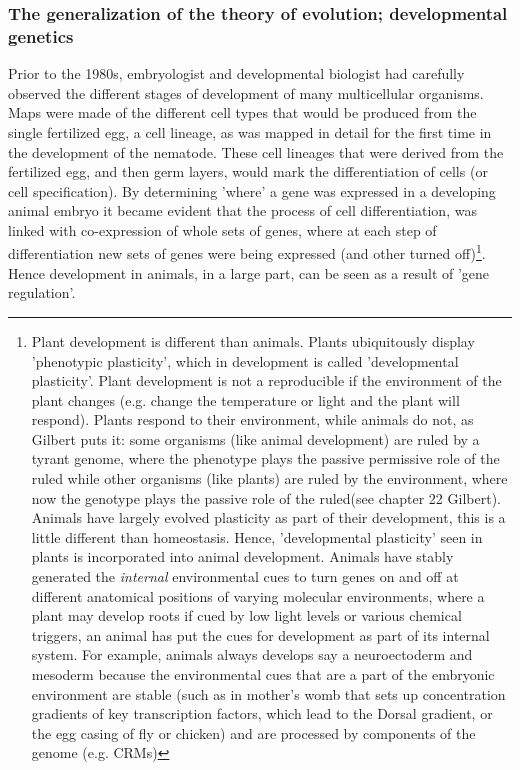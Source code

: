 \subsubsection{The generalization of the theory of evolution; developmental genetics}
Prior to the 1980s, embryologist and developmental biologist had carefully observed the different stages of development of many multicellular organisms.  Maps were made of the different cell types that would be produced from the single fertilized egg, a cell lineage, as was mapped in detail for the first time in the development of the nematode.  These cell lineages that were derived from the fertilized egg, and then germ layers, would mark the differentiation of cells (or cell specification).  By determining 'where' a gene was expressed in a developing animal embryo it became evident that the process of cell differentiation, was linked with co-expression of whole sets of genes, where at each step of differentiation new sets of genes were being expressed (and other turned off)\footnote{Plant development is different than animals.  Plants ubiquitously display 'phenotypic plasticity', which in development is called 'developmental plasticity'.  Plant development is not a reproducible if the environment of the plant changes (e.g. change the temperature or light and the plant will respond).  Plants respond to their environment, while animals do not, as Gilbert puts it: some organisms (like animal development) are ruled by a tyrant genome, where the phenotype plays the passive permissive role of the ruled while other organisms (like plants) are ruled by the environment, where now the genotype plays the passive role of the ruled(see chapter 22 Gilbert\cite{devogilbert}).  Animals have largely evolved plasticity as part of their development, this is a little different than homeostasis.  Hence, 'developmental plasticity' seen in plants is incorporated into animal development.  Animals have stably generated the \textit{internal} environmental cues to turn genes on and off at different anatomical positions of varying molecular environments, where a plant may develop roots if cued by low light levels or various chemical triggers, an animal has put the cues for development as part of its internal system.  For example, animals always develops say a neuroectoderm and mesoderm  because the environmental cues that are a part of the embryonic environment are stable (such as in mother's womb that sets up concentration gradients of key transcription factors, which lead to the Dorsal gradient, or the egg casing of fly or chicken) and are processed by components of the genome (e.g. CRMs)\cite{ecodevo}}.   Hence development in animals, in a large part, can be seen as a result of 'gene regulation'.
 
